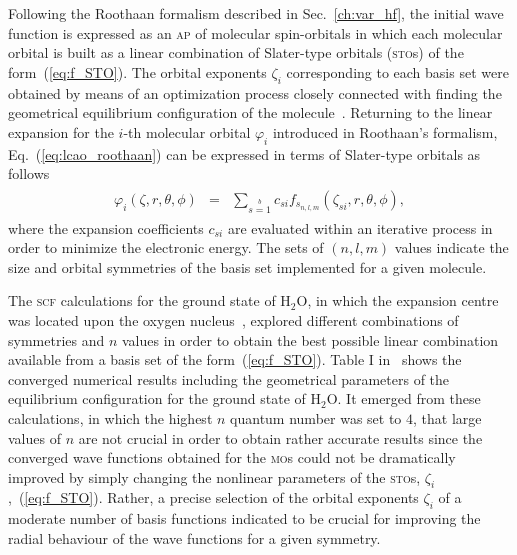 Following the Roothaan formalism described in Sec.~\ref{ch:var_hf},
the initial wave function is expressed as an \textsc{ap} of molecular
spin-orbitals in which each molecular orbital is built as a linear
combination of Slater-type orbitals (\textsc{sto}s) of the
form~(\ref{eq:f_STO}). The orbital exponents $\zeta_{i}$ corresponding
to each basis set were obtained by means of an optimization process
closely connected with finding the geometrical equilibrium
configuration of the
molecule~\cite{Moccia_JCP_2164,Moccia_1964}. Returning to the linear
expansion for the $i$-th molecular orbital $\varphi_{i}$ introduced in
Roothaan's formalism, Eq.~(\ref{eq:lcao_roothaan}) can be expressed in
terms of Slater-type orbitals as follows
%
\begin{eqnarray}
  \begin{split}
    \varphi_{i}(\zeta,r,\theta,\phi) & = &
    \sum\limits_{s=1}\limits^{b} c_{si} f_{s_{n,l,m}}(\zeta_{si},r,\theta,\phi),
  \end{split}
  \label{eq:STO_expansion}
\end{eqnarray}
%
where the expansion coefficients $c_{si}$ are evaluated within an
iterative process in order to minimize the electronic energy. The sets
of $(n,l,m)$ values indicate the size and orbital symmetries of the
basis set implemented for a given molecule.

The \textsc{scf} calculations for the ground state of H$_{2}$O, in
which the expansion centre was located upon the oxygen
nucleus~\cite{Moccia_1964}, explored different combinations of
symmetries and $n$ values in order to obtain the best possible linear
combination available from a basis set of the
form~(\ref{eq:f_STO}). Table I in~\cite{Moccia_1964} shows the
converged numerical results including the geometrical parameters of
the equilibrium configuration for the ground state of H$_{2}$O. It
emerged from these calculations, in which the highest $n$ quantum
number was set to $4$, that large values of $n$ are not crucial in
order to obtain rather accurate results since the converged wave
functions obtained for the \textsc{mo}s could not be dramatically
improved by simply changing the nonlinear parameters of the
\textsc{sto}s, $\zeta_{i}$,~(\ref{eq:f_STO}). Rather, a precise
selection of the orbital exponents $\zeta_{i}$ of a moderate number of
basis functions indicated to be crucial for improving the radial
behaviour of the wave functions for a given symmetry.

